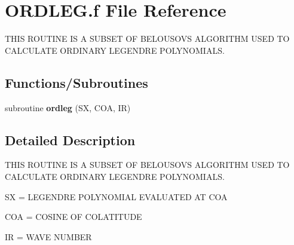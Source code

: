 \hypertarget{ORDLEG_8f}{}\section{O\+R\+D\+L\+E\+G.\+f File Reference}
\label{ORDLEG_8f}


T\+H\+I\+S R\+O\+U\+T\+I\+N\+E I\+S A S\+U\+B\+S\+E\+T O\+F B\+E\+L\+O\+U\+S\+O\+V\+S A\+L\+G\+O\+R\+I\+T\+H\+M U\+S\+E\+D T\+O C\+A\+L\+C\+U\+L\+A\+T\+E O\+R\+D\+I\+N\+A\+R\+Y L\+E\+G\+E\+N\+D\+R\+E P\+O\+L\+Y\+N\+O\+M\+I\+A\+L\+S.  


\subsection*{Functions/\+Subroutines}
\begin{DoxyCompactItemize}
\item 
\hypertarget{ORDLEG_8f_a4735fe09c0b6b2fb4f5823040a0c077b}{}subroutine {\bfseries ordleg} (S\+X, C\+O\+A, I\+R)\label{ORDLEG_8f_a4735fe09c0b6b2fb4f5823040a0c077b}

\end{DoxyCompactItemize}


\subsection{Detailed Description}
T\+H\+I\+S R\+O\+U\+T\+I\+N\+E I\+S A S\+U\+B\+S\+E\+T O\+F B\+E\+L\+O\+U\+S\+O\+V\+S A\+L\+G\+O\+R\+I\+T\+H\+M U\+S\+E\+D T\+O C\+A\+L\+C\+U\+L\+A\+T\+E O\+R\+D\+I\+N\+A\+R\+Y L\+E\+G\+E\+N\+D\+R\+E P\+O\+L\+Y\+N\+O\+M\+I\+A\+L\+S. 

S\+X = L\+E\+G\+E\+N\+D\+R\+E P\+O\+L\+Y\+N\+O\+M\+I\+A\+L E\+V\+A\+L\+U\+A\+T\+E\+D A\+T C\+O\+A

C\+O\+A = C\+O\+S\+I\+N\+E O\+F C\+O\+L\+A\+T\+I\+T\+U\+D\+E

I\+R = W\+A\+V\+E N\+U\+M\+B\+E\+R 